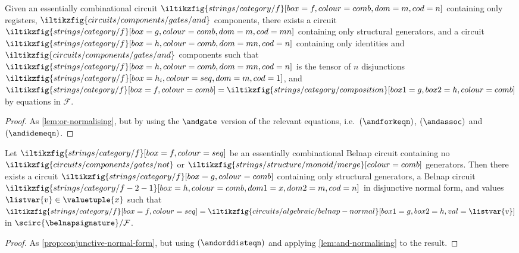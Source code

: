 \begin{lemma}\label{lem:and-normalising}
    Given an essentially combinational circuit \(
    \iltikzfig{strings/category/f}[box=f,colour=comb,dom=m,cod=n]
    \) containing only registers, \(
    \iltikzfig{circuits/components/gates/and}
    \) components, there exists a circuit
    \(
    \iltikzfig{strings/category/f}[box=g,colour=comb,dom=m,cod=mn]
    \) containing only structural generators, and a circuit
    \(
    \iltikzfig{strings/category/f}[box=h,colour=comb,dom=mn,cod=n]
    \) containing only identities and \(
    \iltikzfig{circuits/components/gates/and}
    \) components such that \(
    \iltikzfig{strings/category/f}[box=h,colour=comb,dom=mn,cod=n]
    \) is the tensor of \(n\) disjunctions \(
    \iltikzfig{strings/category/f}[box=h_i,colour=seq,dom=m,cod=1]
    \), and \(
    \iltikzfig{strings/category/f}[box=f,colour=comb]
    =
    \iltikzfig{strings/category/composition}[box1=g,box2=h,colour=comb]
    \) by equations in \(\mathcal{F}\).
\end{lemma}
\begin{proof}
    As \cref{lem:or-normalising}, but by using the \(\andgate\) version of the
    relevant equations, i.e.\ \((\andforkeqn)\), \((\andassoc)\) and \((\andidemeqn)\).
\end{proof}

\begin{proposition}\label{prop:disjunctive-normal-form}
    Let \(
    \iltikzfig{strings/category/f}[box=f,colour=seq]
    \) be an essentially combinational Belnap circuit containing no \(
    \iltikzfig{circuits/components/gates/not}
    \) or \(
    \iltikzfig{strings/structure/monoid/merge}[colour=comb]
    \) generators.
    Then there exists a circuit \(
    \iltikzfig{strings/category/f}[box=g,colour=comb]
    \) containing only structural generators, a Belnap circuit \(
    \iltikzfig{strings/category/f-2-1}[box=h,colour=comb,dom1=x,dom2=m,cod=n]
    \) in disjunctive normal form, and values \(\listvar{v} \in \valuetuple{x}\)
    such that \(
    \iltikzfig{strings/category/f}[box=f,colour=seq]
    =
    \iltikzfig{circuits/algebraic/belnap-normal}[box1=g,box2=h,val=\listvar{v}]
    \) in \(
    \scirc{\belnapsignature} / \mathcal{F}
    \).
\end{proposition}
\begin{proof}
    As \cref{prop:conjunctive-normal-form}, but using \((\andorddisteqn)\) and
    applying \cref{lem:and-normalising} to the result.
\end{proof}

